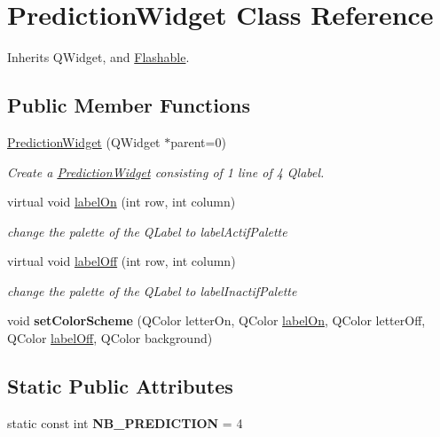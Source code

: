 \hypertarget{class_prediction_widget}{\section{Prediction\-Widget Class Reference}
\label{class_prediction_widget}
}


Inherits Q\-Widget, and \hyperlink{class_flashable}{Flashable}.

\subsection*{Public Member Functions}
\begin{DoxyCompactItemize}
\item 
\hyperlink{class_prediction_widget_aca8be6dfb321e65e094768ae5bd98eea}{Prediction\-Widget} (Q\-Widget $\ast$parent=0)
\begin{DoxyCompactList}\small\item\em Create a \hyperlink{class_prediction_widget}{Prediction\-Widget} consisting of 1 line of 4 Qlabel. \end{DoxyCompactList}\item 
virtual void \hyperlink{class_prediction_widget_adfd7a001533172e8181baae1293f66dd}{label\-On} (int row, int column)
\begin{DoxyCompactList}\small\item\em change the palette of the Q\-Label to label\-Actif\-Palette \end{DoxyCompactList}\item 
virtual void \hyperlink{class_prediction_widget_ade86254c37ebd0adb73a7356fd29800c}{label\-Off} (int row, int column)
\begin{DoxyCompactList}\small\item\em change the palette of the Q\-Label to label\-Inactif\-Palette \end{DoxyCompactList}\item 
\hypertarget{class_prediction_widget_afeb8cd3f247792064a7a09a8b8458b13}{void {\bfseries set\-Color\-Scheme} (Q\-Color letter\-On, Q\-Color \hyperlink{class_prediction_widget_adfd7a001533172e8181baae1293f66dd}{label\-On}, Q\-Color letter\-Off, Q\-Color \hyperlink{class_prediction_widget_ade86254c37ebd0adb73a7356fd29800c}{label\-Off}, Q\-Color background)}\label{class_prediction_widget_afeb8cd3f247792064a7a09a8b8458b13}

\end{DoxyCompactItemize}
\subsection*{Static Public Attributes}
\begin{DoxyCompactItemize}
\item 
\hypertarget{class_prediction_widget_a30fe4fd225d0566a64b5c784d7d8ed52}{static const int {\bfseries N\-B\-\_\-\-P\-R\-E\-D\-I\-C\-T\-I\-O\-N} = 4}\label{class_prediction_widget_a30fe4fd225d0566a64b5c784d7d8ed52}

\end{DoxyCompactItemize}


